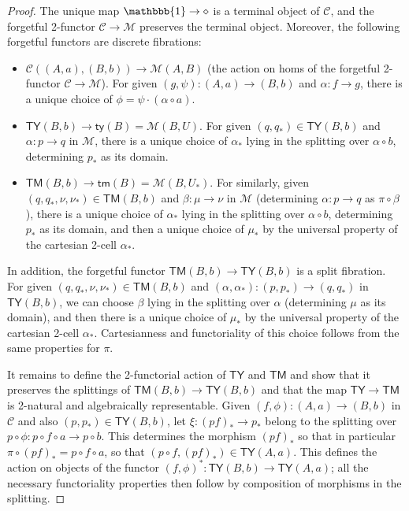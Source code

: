 \documentclass[10pt]{article}
\theoremstyle{definition}
\newcommand\M{\mathcal{M}}
\newcommand\Mty{\mathsf{ty}}
\newcommand\Mtm{\mathsf{tm}}
\newcommand\C{\mathcal{C}}
\newcommand\Cty{\mathsf{TY}}
\newcommand\Ctm{\mathsf{TM}}
\newcommand\one{\mathbbb{1}}
\newcommand\ec{\diamond}
\newcommand\Un{U}
\newcommand\Ub{U_*}
\newcommand\pb{p_*}
\newcommand\qb{q_*}
\newcommand\alb{\alpha_*}
\newcommand\mub{\mu_*}
\newcommand\nub{\nu_*}
\newcommand\bb[1]{{(#1)}_*}
\begin{document}
\begin{proof}
  The unique map $\one\to\ec$ is a terminal object of $\C$, and the forgetful 2-functor $\C\to\M$ preserves the terminal object.
  Moreover, the following forgetful functors are discrete fibrations:
  \begin{itemize}
  \item $\C((A,a),(B,b)) \to \M(A,B)$ (the action on homs of the forgetful 2-functor $\C\to\M$).
    For given $(g,\psi) : (A,a) \to (B,b)$ and $\alpha:f\to g$, there is a unique choice of $\phi = \psi\cdot (\alpha\circ a)$.
  \item $\Cty(B,b) \to \Mty(B) = \M(B,\Un)$.
    For given $(q,\qb)\in\Cty(B,b)$ and $\alpha:p\to q$ in $\M$, there is a unique choice of $\alb$ lying in the splitting over $\alpha\circ b$, determining $\pb$ as its domain.
  \item $\Ctm(B,b) \to \Mtm(B) = \M(B,\Ub)$.
    For similarly, given $(q,\qb,\nu,\nub)\in\Ctm(B,b)$ and $\beta : \mu \to \nu$ in $\M$ (determining $\alpha : p \to q$ as $\pi \circ \beta$), there is a unique choice of $\alb$ lying in the splitting over $\alpha\circ b$, determining $\pb$ as its domain, and then a unique choice of $\mub$ by the universal property of the cartesian 2-cell $\alb$.
  \end{itemize}
  In addition, the forgetful functor $\Ctm(B,b) \to \Cty(B,b)$ is a split fibration.
  For given $(q,\qb,\nu,\nub)\in\Ctm(B,b)$ and $(\alpha,\alb):(p,\pb) \to (q,\qb)$ in $\Cty(B,b)$, we can choose $\beta$ lying in the splitting over $\alpha$ (determining $\mu$ as its domain), and then there is a unique choice of $\mub$ by the universal property of the cartesian 2-cell $\alb$.
  Cartesianness and functoriality of this choice follows from the same properties for $\pi$.

  It remains to define the 2-functorial action of $\Cty$ and $\Ctm$ and show that it preserves the splittings of $\Ctm(B,b) \to \Cty(B,b)$ and that the map $\Cty\to\Ctm$ is 2-natural and algebraically representable.
  Given $(f,\phi) : (A,a) \to (B,b)$ in $\C$ and also $(p,\pb)\in \Cty(B,b)$, let $\xi : \bb{pf} \to \pb$ belong to the splitting over $p\circ \phi : p\circ f\circ a \to p\circ b$.
  This determines the morphism $\bb{pf}$ so that in particular $\pi\circ \bb{pf} = p\circ f\circ a$, so that $(p\circ f, \bb{pf}) \in \Cty(A,a)$.
  This defines the action on objects of the functor $(f,\phi)^*: \Cty(B,b) \to \Cty(A,a)$; all the necessary functoriality properties then follow by composition of morphisms in the splitting.


\end{proof}
\end{document}
